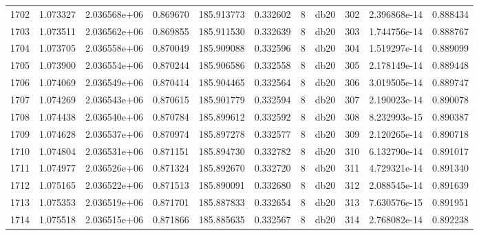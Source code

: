 \begin{tabular}{lrrrrrrlrrr}
1702 &    1.073327 &        2.036568e+06 &  0.869670 &              185.913773 &    0.332602 &       8 &         db20 &    302 &   2.396868e-14 &      0.888434 \\
1703 &    1.073511 &        2.036562e+06 &  0.869855 &              185.911530 &    0.332639 &       8 &         db20 &    303 &   1.744756e-14 &      0.888767 \\
1704 &    1.073705 &        2.036558e+06 &  0.870049 &              185.909088 &    0.332596 &       8 &         db20 &    304 &   1.519297e-14 &      0.889099 \\
1705 &    1.073900 &        2.036554e+06 &  0.870244 &              185.906586 &    0.332558 &       8 &         db20 &    305 &   2.178149e-14 &      0.889448 \\
1706 &    1.074069 &        2.036549e+06 &  0.870414 &              185.904465 &    0.332564 &       8 &         db20 &    306 &   3.019505e-14 &      0.889747 \\
1707 &    1.074269 &        2.036543e+06 &  0.870615 &              185.901779 &    0.332594 &       8 &         db20 &    307 &   2.190023e-14 &      0.890078 \\
1708 &    1.074438 &        2.036540e+06 &  0.870784 &              185.899612 &    0.332592 &       8 &         db20 &    308 &   8.232993e-15 &      0.890387 \\
1709 &    1.074628 &        2.036537e+06 &  0.870974 &              185.897278 &    0.332577 &       8 &         db20 &    309 &   2.120265e-14 &      0.890718 \\
1710 &    1.074804 &        2.036531e+06 &  0.871151 &              185.894730 &    0.332782 &       8 &         db20 &    310 &   6.132790e-14 &      0.891017 \\
1711 &    1.074977 &        2.036526e+06 &  0.871324 &              185.892670 &    0.332720 &       8 &         db20 &    311 &   4.729321e-14 &      0.891340 \\
1712 &    1.075165 &        2.036522e+06 &  0.871513 &              185.890091 &    0.332680 &       8 &         db20 &    312 &   2.088545e-14 &      0.891639 \\
1713 &    1.075353 &        2.036519e+06 &  0.871701 &              185.887833 &    0.332654 &       8 &         db20 &    313 &   7.630576e-15 &      0.891951 \\
1714 &    1.075518 &        2.036515e+06 &  0.871866 &              185.885635 &    0.332567 &       8 &         db20 &    314 &   2.768082e-14 &      0.892238 \\

\end{tabular}
